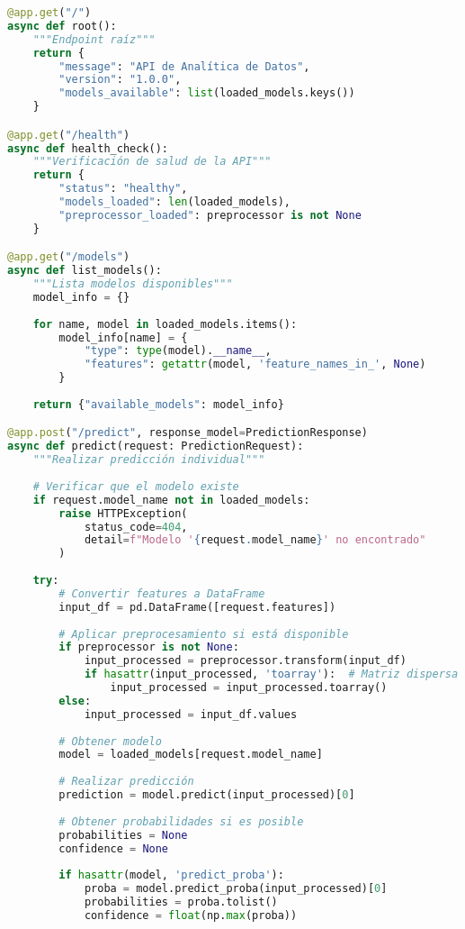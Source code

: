 \begin{lstlisting}[language=Python, caption=API REST para predicciones en tiempo real]
@app.get("/")
async def root():
    """Endpoint raíz"""
    return {
        "message": "API de Analítica de Datos",
        "version": "1.0.0",
        "models_available": list(loaded_models.keys())
    }

@app.get("/health")
async def health_check():
    """Verificación de salud de la API"""
    return {
        "status": "healthy",
        "models_loaded": len(loaded_models),
        "preprocessor_loaded": preprocessor is not None
    }

@app.get("/models")
async def list_models():
    """Lista modelos disponibles"""
    model_info = {}
    
    for name, model in loaded_models.items():
        model_info[name] = {
            "type": type(model).__name__,
            "features": getattr(model, 'feature_names_in_', None)
        }
    
    return {"available_models": model_info}

@app.post("/predict", response_model=PredictionResponse)
async def predict(request: PredictionRequest):
    """Realizar predicción individual"""
    
    # Verificar que el modelo existe
    if request.model_name not in loaded_models:
        raise HTTPException(
            status_code=404, 
            detail=f"Modelo '{request.model_name}' no encontrado"
        )
    
    try:
        # Convertir features a DataFrame
        input_df = pd.DataFrame([request.features])
        
        # Aplicar preprocesamiento si está disponible
        if preprocessor is not None:
            input_processed = preprocessor.transform(input_df)
            if hasattr(input_processed, 'toarray'):  # Matriz dispersa
                input_processed = input_processed.toarray()
        else:
            input_processed = input_df.values
        
        # Obtener modelo
        model = loaded_models[request.model_name]
        
        # Realizar predicción
        prediction = model.predict(input_processed)[0]
        
        # Obtener probabilidades si es posible
        probabilities = None
        confidence = None
        
        if hasattr(model, 'predict_proba'):
            proba = model.predict_proba(input_processed)[0]
            probabilities = proba.tolist()
            confidence = float(np.max(proba))
        

\end{lstlisting}
